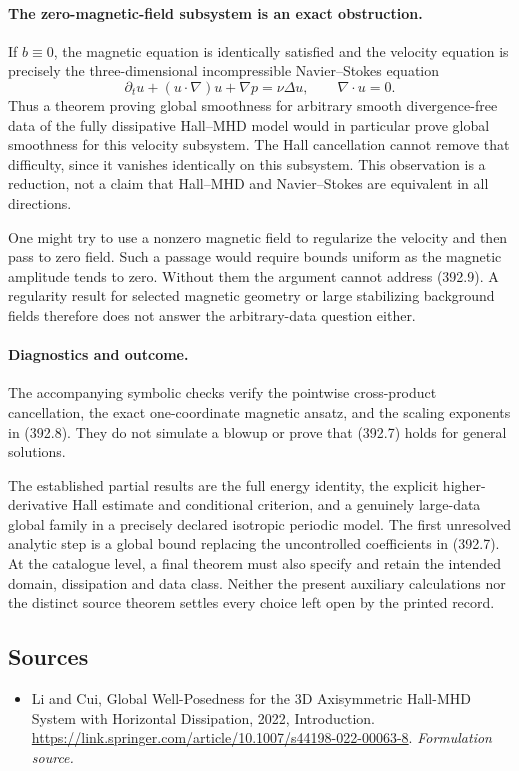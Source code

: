 \documentclass[11pt]{article}
\begin{document}
\paragraph{The zero-magnetic-field subsystem is an exact obstruction.}
If $b\equiv0$, the magnetic equation is identically satisfied and
the velocity equation is precisely the three-dimensional
incompressible Navier--Stokes equation
\[
 \partial_tu+(u\cdot\nabla)u+\nabla p=\nu\Delta u,
 \qquad\nabla\cdot u=0.
 \tag{392.9}
\]
Thus a theorem proving global smoothness for arbitrary smooth
divergence-free data of the fully dissipative Hall--MHD model would
in particular prove global smoothness for this velocity subsystem.
The Hall cancellation cannot remove that difficulty, since it
vanishes identically on this subsystem. This observation is a
reduction, not a claim that Hall--MHD and Navier--Stokes are
equivalent in all directions.

One might try to use a nonzero magnetic field to regularize the
velocity and then pass to zero field. Such a passage would require
bounds uniform as the magnetic amplitude tends to zero. Without
them the argument cannot address (392.9). A regularity result for
selected magnetic geometry or large stabilizing background fields
therefore does not answer the arbitrary-data question either.

\paragraph{Diagnostics and outcome.}
The accompanying symbolic checks verify the pointwise cross-product
cancellation, the exact one-coordinate magnetic ansatz, and the
scaling exponents in (392.8). They do not simulate a blowup or
prove that (392.7) holds for general solutions.

The established partial results are the full energy identity, the
explicit higher-derivative Hall estimate and conditional criterion,
and a genuinely large-data global family in a precisely declared
isotropic periodic model. The first unresolved analytic step is a
global bound replacing the uncontrolled coefficients in (392.7).
At the catalogue level, a final theorem must also specify and
retain the intended domain, dissipation and data class. Neither
the present auxiliary calculations nor the distinct source theorem
settles every choice left open by the printed record.
\subsection{Sources}
\begin{itemize}
\item[S1]Li and Cui, Global Well-Posedness for the 3D Axisymmetric Hall-MHD System with Horizontal Dissipation, 2022, Introduction.
\url{https://link.springer.com/article/10.1007/s44198-022-00063-8}.
\textit{Formulation source.}
\end{itemize}
\end{document}

